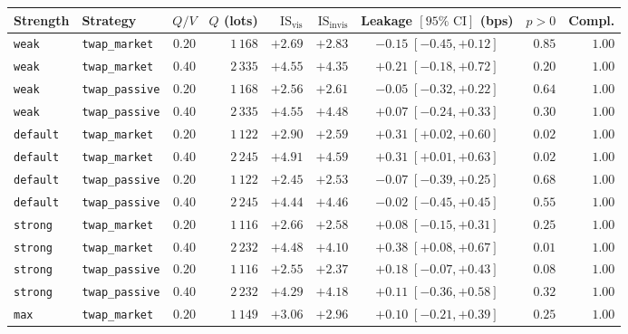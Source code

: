 \documentclass[11pt,a4paper]{article}
\newcommand{\code}[1]{\texttt{#1}}
\begin{document}
\begin{table}[h!]
\centering\small\setlength{\tabcolsep}{4pt}
\begin{tabular}{l l c r r r c r r}
\toprule
Strength & Strategy & $Q/V$ & $Q$ (lots) & $\text{IS}_{\text{vis}}$ & $\text{IS}_{\text{invis}}$ & Leakage $[95\%\text{ CI}]$ (bps) & $p > 0$ & Compl. \\
\midrule
\code{weak}    & \code{twap\_market}  & $0.20$ & $1\,168$ & $+2.69$ & $+2.83$ & $-0.15\;[-0.45, +0.12]$ & $0.85$ & $1.00$ \\
\code{weak}    & \code{twap\_market}  & $0.40$ & $2\,335$ & $+4.55$ & $+4.35$ & $+0.21\;[-0.18, +0.72]$ & $0.20$ & $1.00$ \\
\code{weak}    & \code{twap\_passive} & $0.20$ & $1\,168$ & $+2.56$ & $+2.61$ & $-0.05\;[-0.32, +0.22]$ & $0.64$ & $1.00$ \\
\code{weak}    & \code{twap\_passive} & $0.40$ & $2\,335$ & $+4.55$ & $+4.48$ & $+0.07\;[-0.24, +0.33]$ & $0.30$ & $1.00$ \\
\midrule
\code{default} & \code{twap\_market}  & $0.20$ & $1\,122$ & $+2.90$ & $+2.59$ & $\mathbf{+0.31\;[+0.02, +0.60]}$ & $\mathbf{0.02}$ & $1.00$ \\
\code{default} & \code{twap\_market}  & $0.40$ & $2\,245$ & $+4.91$ & $+4.59$ & $\mathbf{+0.31\;[+0.01, +0.63]}$ & $\mathbf{0.02}$ & $1.00$ \\
\code{default} & \code{twap\_passive} & $0.20$ & $1\,122$ & $+2.45$ & $+2.53$ & $-0.07\;[-0.39, +0.25]$ & $0.68$ & $1.00$ \\
\code{default} & \code{twap\_passive} & $0.40$ & $2\,245$ & $+4.44$ & $+4.46$ & $-0.02\;[-0.45, +0.45]$ & $0.55$ & $1.00$ \\
\midrule
\code{strong}  & \code{twap\_market}  & $0.20$ & $1\,116$ & $+2.66$ & $+2.58$ & $+0.08\;[-0.15, +0.31]$ & $0.25$ & $1.00$ \\
\code{strong}  & \code{twap\_market}  & $0.40$ & $2\,232$ & $+4.48$ & $+4.10$ & $\mathbf{+0.38\;[+0.08, +0.67]}$ & $\mathbf{0.01}$ & $1.00$ \\
\code{strong}  & \code{twap\_passive} & $0.20$ & $1\,116$ & $+2.55$ & $+2.37$ & $+0.18\;[-0.07, +0.43]$ & $0.08$ & $1.00$ \\
\code{strong}  & \code{twap\_passive} & $0.40$ & $2\,232$ & $+4.29$ & $+4.18$ & $+0.11\;[-0.36, +0.58]$ & $0.32$ & $1.00$ \\
\midrule
\code{max}     & \code{twap\_market}  & $0.20$ & $1\,149$ & $+3.06$ & $+2.96$ & $+0.10\;[-0.21, +0.39]$ & $0.25$ & $1.00$ \\

\end{tabular}
\end{table}
\end{document}
